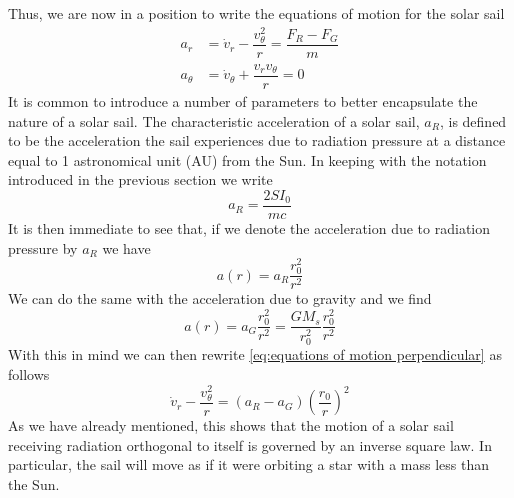 \documentclass[twocolumn,12pt,a4paper]{article}
\numberwithin{equation}{section}
\begin{document}
Thus, we are now in a position to write the equations of motion for the solar sail
\begin{align}
	a_{r} &= \dot{v}_r - \dfrac{v_{\theta}^2}{r} = \dfrac{F_R - F_G}{m} \label{eq:equations of motion perpendicular} \\
	a_{\theta} &= \dot{v}_{\theta} + \dfrac{v_r v_{\theta}}{r} = 0 
\end{align}
It is common to introduce a number of parameters to better encapsulate the nature of a solar sail. The characteristic acceleration of a solar sail, \( a_R \), is defined to be the acceleration the sail experiences due to radiation pressure at a distance equal to 1 astronomical unit (AU) from the Sun. In keeping with the notation introduced in the previous section we write
\begin{equation} \label{eq:characterisit acceleration}
  a_R = \dfrac{2SI_0}{mc}
\end{equation}
It is then immediate to see that, if we denote the acceleration due to radiation pressure by \( a_R \) we have
\begin{equation}
  a(r) = a_R \dfrac{r_0^2}{r^2} 
\end{equation}
We can do the same with the acceleration due to gravity and we find
\begin{equation}
  a(r) = a_G \dfrac{r_0^2}{r^2} = \dfrac{G M_s}{r_0^2} \dfrac{r_0^2}{r^2}
\end{equation}
With this in mind we can then rewrite \autoref{eq:equations of motion perpendicular} as follows
\begin{equation} \label{eq:equations of motion characteristic accelerations}
  \dot{v}_r - \dfrac{v_{\theta}^2}{r} = (a_R - a_G) \left(\dfrac{r_0}{r}\right)^2 
\end{equation}
As we have already mentioned, this shows that the motion of a solar sail receiving radiation orthogonal to itself is governed by an inverse square law. In particular, the sail will move as if it were orbiting a star with a mass less than the Sun.
\end{document}
